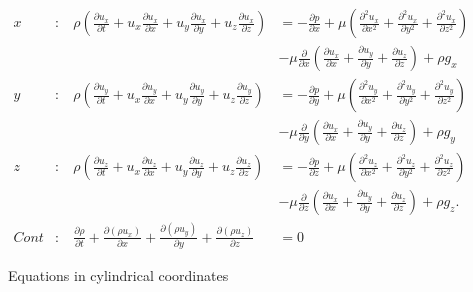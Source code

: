 \documentclass[palatino]{epflnotes}
\begin{document}
\(
\begin{aligned}
 x&:\ &\rho \left(\frac{\partial u_x}{\partial t} + u_x \frac{\partial u_x}{\partial x} + u_y \frac{\partial u_x}{\partial y} + u_z \frac{\partial u_x}{\partial z}\right) &= -\frac{\partial p}{\partial x} + \mu \left(\frac{\partial^2 u_x}{\partial x^2} + \frac{\partial^2 u_x}{\partial y^2} + \frac{\partial^2 u_x}{\partial z^2}\right) \\ & & &- \mu \frac{\partial}{\partial x} \left( \frac{\partial u_x}{\partial x} + \frac{\partial u_y}{\partial y} + \frac{\partial u_z}{\partial z} \right) + \rho g_x \\
 y&:\ &\rho \left(\frac{\partial u_y}{\partial t} + u_x \frac{\partial u_y}{\partial x} + u_y \frac{\partial u_y}{\partial y}+ u_z \frac{\partial u_y}{\partial z}\right) &= -\frac{\partial p}{\partial y} + \mu \left(\frac{\partial^2 u_y}{\partial x^2} + \frac{\partial^2 u_y}{\partial y^2} + \frac{\partial^2 u_y}{\partial z^2}\right) \\ & & &- \mu \frac{\partial}{\partial y} \left( \frac{\partial u_x}{\partial x} + \frac{\partial u_y}{\partial y} + \frac{\partial u_z}{\partial z} \right) + \rho g_y \\
 z&:\ &\rho \left(\frac{\partial u_z}{\partial t} + u_x \frac{\partial u_z}{\partial x} + u_y \frac{\partial u_z}{\partial y}+ u_z \frac{\partial u_z}{\partial z}\right) &= -\frac{\partial p}{\partial z} + \mu \left(\frac{\partial^2 u_z}{\partial x^2} + \frac{\partial^2 u_z}{\partial y^2} + \frac{\partial^2 u_z}{\partial z^2}\right) \\ & & &- \mu \frac{\partial}{\partial z} \left( \frac{\partial u_x}{\partial x} + \frac{\partial u_y}{\partial y} + \frac{\partial u_z}{\partial z} \right) + \rho g_z. \\
 Cont&:\ &  \frac{\partial \rho}{\partial t} + \frac{\partial \left(\rho u_x \right) }{ \partial x} + \frac{\partial \left(\rho u_y\right) }{ \partial y} + \frac{\partial \left(\rho u_z\right) }{ \partial z} &= 0
\end{aligned} \label{eq:NavierStokes:Cartesian} \)

Equations in cylindrical coordinates
\end{document}
